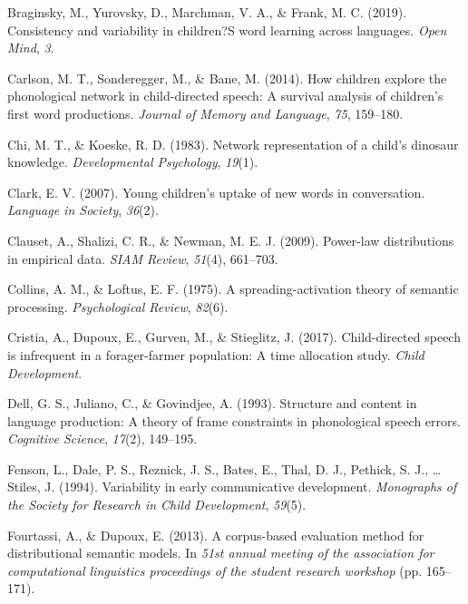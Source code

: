\documentclass[english,,man,floatsintext]{apa6}
\begin{document}
\leavevmode\hypertarget{ref-braginsky2019}{}%
Braginsky, M., Yurovsky, D., Marchman, V. A., \& Frank, M. C. (2019). Consistency and variability in children?S word learning across languages. \emph{Open Mind}, \emph{3}.

\leavevmode\hypertarget{ref-carlson2014}{}%
Carlson, M. T., Sonderegger, M., \& Bane, M. (2014). How children explore the phonological network in child-directed speech: A survival analysis of children's first word productions. \emph{Journal of Memory and Language}, \emph{75}, 159--180.

\leavevmode\hypertarget{ref-chi1983}{}%
Chi, M. T., \& Koeske, R. D. (1983). Network representation of a child's dinosaur knowledge. \emph{Developmental Psychology}, \emph{19}(1).

\leavevmode\hypertarget{ref-clark2007}{}%
Clark, E. V. (2007). Young children's uptake of new words in conversation. \emph{Language in Society}, \emph{36}(2).

\leavevmode\hypertarget{ref-clauset09}{}%
Clauset, A., Shalizi, C. R., \& Newman, M. E. J. (2009). Power-law distributions in empirical data. \emph{SIAM Review}, \emph{51}(4), 661--703.

\leavevmode\hypertarget{ref-collins1975}{}%
Collins, A. M., \& Loftus, E. F. (1975). A spreading-activation theory of semantic processing. \emph{Psychological Review}, \emph{82}(6).

\leavevmode\hypertarget{ref-cristia2017}{}%
Cristia, A., Dupoux, E., Gurven, M., \& Stieglitz, J. (2017). Child-directed speech is infrequent in a forager-farmer population: A time allocation study. \emph{Child Development}.

\leavevmode\hypertarget{ref-dell1993}{}%
Dell, G. S., Juliano, C., \& Govindjee, A. (1993). Structure and content in language production: A theory of frame constraints in phonological speech errors. \emph{Cognitive Science}, \emph{17}(2), 149--195.

\leavevmode\hypertarget{ref-fenson94}{}%
Fenson, L., Dale, P. S., Reznick, J. S., Bates, E., Thal, D. J., Pethick, S. J., \ldots{} Stiles, J. (1994). Variability in early communicative development. \emph{Monographs of the Society for Research in Child Development}, \emph{59}(5).

\leavevmode\hypertarget{ref-fourtassi2013}{}%
Fourtassi, A., \& Dupoux, E. (2013). A corpus-based evaluation method for distributional semantic models. In \emph{51st annual meeting of the association for computational linguistics proceedings of the student research workshop} (pp. 165--171).
\end{document}
